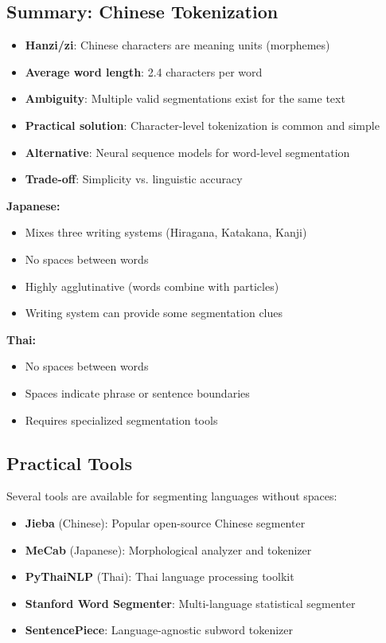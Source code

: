 \documentclass[11pt,a4paper]{article}
\theoremstyle{definition}
\theoremstyle{plain}
\theoremstyle{remark}
\begin{document}
\subsection{Summary: Chinese Tokenization}

\begin{itemize}
    \item \textbf{Hanzi/zi}: Chinese characters are meaning units (morphemes)
    \item \textbf{Average word length}: 2.4 characters per word
    \item \textbf{Ambiguity}: Multiple valid segmentations exist for the same text
    \item \textbf{Practical solution}: Character-level tokenization is common and simple
    \item \textbf{Alternative}: Neural sequence models for word-level segmentation
    \item \textbf{Trade-off}: Simplicity vs. linguistic accuracy
\end{itemize}

\textbf{Japanese:}
\begin{itemize}
    \item Mixes three writing systems (Hiragana, Katakana, Kanji)
    \item No spaces between words
    \item Highly agglutinative (words combine with particles)
    \item Writing system can provide some segmentation clues
\end{itemize}

\textbf{Thai:}
\begin{itemize}
    \item No spaces between words
    \item Spaces indicate phrase or sentence boundaries
    \item Requires specialized segmentation tools
\end{itemize}

\subsection{Practical Tools}

Several tools are available for segmenting languages without spaces:

\begin{itemize}
    \item \textbf{Jieba} (Chinese): Popular open-source Chinese segmenter
    \item \textbf{MeCab} (Japanese): Morphological analyzer and tokenizer
    \item \textbf{PyThaiNLP} (Thai): Thai language processing toolkit
    \item \textbf{Stanford Word Segmenter}: Multi-language statistical segmenter
    \item \textbf{SentencePiece}: Language-agnostic subword tokenizer
\end{itemize}
\end{document}
